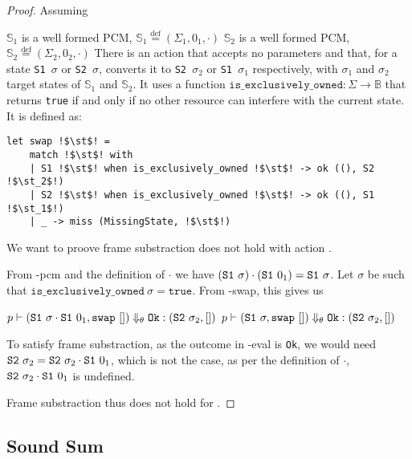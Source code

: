 \documentclass[,a4paper,oneside]{article}
\newcommand{\code}[1]{\texttt{#1}}
\newcommand{\defeq}[0]{\stackrel{\text{def}}=}
\newcommand{\mmdl}[0]{\ensuremath{\mathbb S}}
\newcommand{\rarr}[0]{\ensuremath{\rightarrow}}
\newcommand{\st}[0]{\sigma}
\newcommand{\evalsto}[3]{\ensuremath{p\vdash(#1)\Downarrow_\theta#2:(#3)}}
\newcommand{\Ok}[0]{\code{Ok}}
\newcommand{\bools}[0]{\mathbb{B}}
\newcommand{\vtrue}[0]{\texttt{true}}
\begin{document}
\begin{proof}


Assuming 
\begin{hypvlist}
 $\mmdl_1$ is a well formed PCM, $\mmdl_1 \defeq (\Sigma_1, 0_1, \cdot)$
 $\mmdl_2$ is a well formed PCM, $\mmdl_2 \defeq (\Sigma_2, 0_2, \cdot)$
 There is an action \swap{} that accepts no parameters and that, for a state \code{S1 $\st$} or \code{S2 $\st$}, converts it to \code{S2 $\st_2$} or \code{S1 $\st_1$} respectively, with $\st_1$ and $\st_2$ target states of $\mmdl_1$ and $\mmdl_2$. It uses a function ${\code{is\_exclusively\_owned} : \Sigma\rarr \bools}$ that returns \vtrue{} if and only if no other resource can interfere with the current state. It is defined as: 

\begin{verbatim}
let swap !$\st$! =
	match !$\st$! with
	| S1 !$\st$! when is_exclusively_owned !$\st$! -> ok ((), S2 !$\st_2$!)
	| S2 !$\st$! when is_exclusively_owned !$\st$! -> ok ((), S1 !$\st_1$!)
	| _ -> miss (MissingState, !$\st$!)
\end{verbatim}
\end{hypvlist}
	
We want to proove frame substraction does not hold with action \swap.

From \hyp{pcm} and the definition of $\cdot$ we have $(\sone\st) \cdot (\sone0_1) = \sone\st$. Let $\st$ be such that $\code{is\_exclusively\_owned}~\st=\vtrue$. From \hyp{swap}, this gives us 
\begin{hypvlist}
	 $\evalsto{\sone\st \cdot \sone0_1, \swap~[]}{\Ok}{\stwo\st_2, []}$
	 $\evalsto{\sone\st,\swap~[]}{\Ok}{\stwo\st_2, []}$\end{hypvlist}

To satisfy frame substraction, as the outcome in \hyp{eval} is \Ok, we would need $\stwo\st_2 = \stwo\st_2 \cdot \sone0_1$, which is not the case, as per the definition of $\cdot$, $\stwo\st_2 \cdot \sone0_1$ is undefined.

Frame substraction thus does not hold for \swap.
\end{proof}

\subsection{Sound Sum}
\end{document}
